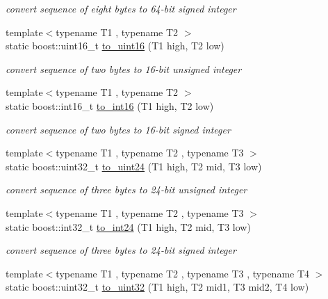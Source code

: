 \begin{DoxyCompactItemize}
\begin{DoxyCompactList}\small\item\em convert sequence of eight bytes to 64-\/bit signed integer \end{DoxyCompactList}\item 
{\footnotesize template$<$typename T1 , typename T2 $>$ }\\static boost\-::uint16\-\_\-t \hyperlink{structpion_1_1algorithm_a260aedfd03824ec43e7a11a9bb410b69}{to\-\_\-uint16} (T1 high, T2 low)
\begin{DoxyCompactList}\small\item\em convert sequence of two bytes to 16-\/bit unsigned integer \end{DoxyCompactList}\item 
{\footnotesize template$<$typename T1 , typename T2 $>$ }\\static boost\-::int16\-\_\-t \hyperlink{structpion_1_1algorithm_ae474bcdaf7b1a54182e1724c8ebe3410}{to\-\_\-int16} (T1 high, T2 low)
\begin{DoxyCompactList}\small\item\em convert sequence of two bytes to 16-\/bit signed integer \end{DoxyCompactList}\item 
{\footnotesize template$<$typename T1 , typename T2 , typename T3 $>$ }\\static boost\-::uint32\-\_\-t \hyperlink{structpion_1_1algorithm_a1080e1965b34717702987a559665a8e9}{to\-\_\-uint24} (T1 high, T2 mid, T3 low)
\begin{DoxyCompactList}\small\item\em convert sequence of three bytes to 24-\/bit unsigned integer \end{DoxyCompactList}\item 
{\footnotesize template$<$typename T1 , typename T2 , typename T3 $>$ }\\static boost\-::int32\-\_\-t \hyperlink{structpion_1_1algorithm_aed87f4efd146f0d6afdedc8618dfac9c}{to\-\_\-int24} (T1 high, T2 mid, T3 low)
\begin{DoxyCompactList}\small\item\em convert sequence of three bytes to 24-\/bit signed integer \end{DoxyCompactList}\item 
{\footnotesize template$<$typename T1 , typename T2 , typename T3 , typename T4 $>$ }\\static boost\-::uint32\-\_\-t \hyperlink{structpion_1_1algorithm_a14437094ac2afa2b8b2f94a92baf7253}{to\-\_\-uint32} (T1 high, T2 mid1, T3 mid2, T4 low)

\end{DoxyCompactItemize}
